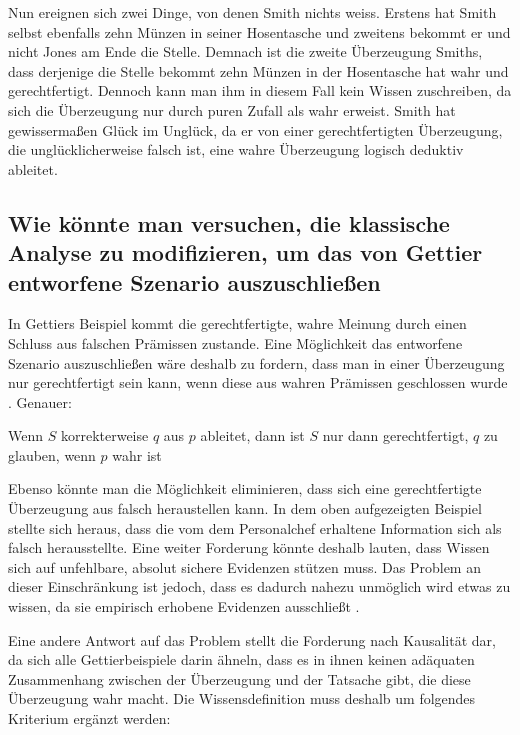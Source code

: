 \documentclass[a4paper]{article}
\begin{document}
Nun ereignen sich zwei Dinge, von denen Smith nichts weiss. Erstens hat Smith selbst ebenfalls zehn Münzen in seiner Hosentasche und zweitens bekommt er und nicht Jones am Ende die Stelle. Demnach ist die zweite Überzeugung Smiths, dass derjenige die Stelle bekommt zehn Münzen in der Hosentasche hat wahr und gerechtfertigt. Dennoch kann man ihm in diesem Fall kein Wissen zuschreiben, da sich die Überzeugung nur durch puren Zufall als wahr erweist. Smith hat gewissermaßen Glück im Unglück, da er von einer gerechtfertigten Überzeugung, die unglücklicherweise falsch ist, eine wahre Überzeugung logisch deduktiv ableitet.

\subsection{Wie könnte man versuchen, die klassische Analyse zu modifizieren, um das von Gettier entworfene Szenario auszuschließen}
In Gettiers Beispiel kommt die gerechtfertigte, wahre Meinung durch einen Schluss aus falschen Prämissen zustande. Eine Möglichkeit das entworfene Szenario auszuschließen wäre deshalb zu fordern, dass man in einer Überzeugung nur gerechtfertigt sein kann, wenn diese aus wahren Prämissen geschlossen wurde \cite{gettier1}. Genauer:
\begin{center}
    Wenn $S$ korrekterweise $q$ aus $p$ ableitet, dann ist $S$ nur dann gerechtfertigt, $q$ zu glauben, wenn $p$ wahr ist
\end{center}
Ebenso könnte man die Möglichkeit eliminieren, dass sich eine gerechtfertigte Überzeugung aus falsch heraustellen kann. In dem oben aufgezeigten Beispiel stellte sich heraus, dass die vom dem Personalchef erhaltene Information sich als falsch herausstellte. Eine weiter Forderung könnte deshalb lauten, dass Wissen sich auf unfehlbare, absolut sichere Evidenzen stützen muss. Das Problem an dieser Einschränkung ist jedoch, dass es dadurch nahezu unmöglich wird etwas zu wissen, da sie empirisch erhobene Evidenzen ausschließt \cite{gettier2}.

Eine andere Antwort auf das Problem stellt die Forderung nach Kausalität dar, da sich alle Gettierbeispiele darin ähneln, dass es in ihnen keinen adäquaten Zusammenhang zwischen der Überzeugung und der Tatsache gibt, die diese Überzeugung wahr macht. Die Wissensdefinition muss deshalb um folgendes Kriterium ergänzt werden:
\end{document}

